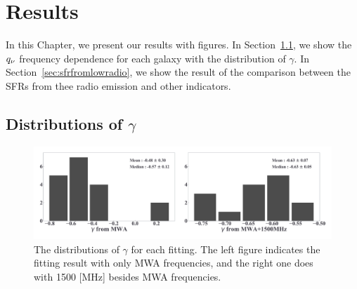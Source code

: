 \chapter{Results}\label{chap:results}
\begin{chapabstract}

In this Chapter, we present our results with figures.
In Section~\ref{sec:GammaDistribution}, we show the $q_{\nu}$ frequency dependence for each galaxy with the distribution of $\gamma$.
In Section~\ref{sec:sfrfromlowradio}, we show the result of the comparison between the SFRs from thee radio emission and other indicators.

\end{chapabstract}


%

\section{Distributions of $\gamma$}\label{sec:GammaDistribution}

\begin{figure}[htbp]
	\centering
	\includegraphics[width=\linewidth]{Chapter_5/Figures/Result_comparehist.pdf}
    \caption[Histograms of $\gamma$ from the fitting]{\label{fig:comparehist}
        The distributions of $\gamma$ for each fitting.
        The left figure indicates the fitting result with only MWA frequencies, and the right one does with 1500 [MHz] besides MWA frequencies.
    }
\end{figure}


